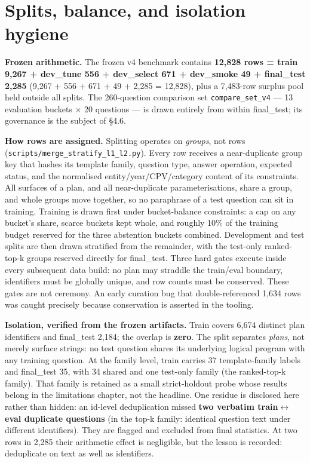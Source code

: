 \section{Splits, balance, and isolation hygiene}\label{sec:splits-balance-and-isolation-hygiene}

\textbf{Frozen arithmetic.} The frozen v4 benchmark contains \textbf{12,828 rows = train 9,267 + dev\_tune 556 + dev\_select 671 + dev\_smoke 49 + final\_test 2,285} (9,267 + 556 + 671 + 49 + 2,285 = 12,828), plus a 7,483-row surplus pool held outside all splits. The 260-question comparison set \texttt{compare\_set\_v4} --- 13 evaluation buckets $\times$ 20 questions --- is drawn entirely from within final\_test; its governance is the subject of §4.6.

\textbf{How rows are assigned.} Splitting operates on \emph{groups}, not rows (\texttt{scripts/merge\_stratify\_l1\_l2.py}). Every row receives a near-duplicate group key that hashes its template family, question type, answer operation, expected status, and the normalised entity/year/CPV/category content of its constraints. All surfaces of a plan, and all near-duplicate parameterisations, share a group, and whole groups move together, so no paraphrase of a test question can sit in training. Training is drawn first under bucket-balance constraints: a cap on any bucket's share, scarce buckets kept whole, and roughly 10\% of the training budget reserved for the three abstention buckets combined. Development and test splits are then drawn stratified from the remainder, with the test-only ranked-top-k groups reserved directly for final\_test. Three hard gates execute inside every subsequent data build: no plan may straddle the train/eval boundary, identifiers must be globally unique, and row counts must be conserved. These gates are not ceremony. An early curation bug that double-referenced 1,634 rows was caught precisely because conservation is asserted in the tooling.

\textbf{Isolation, verified from the frozen artifacts.} Train covers 6,674 distinct plan identifiers and final\_test 2,184; the overlap is \textbf{zero}. The split separates \emph{plans}, not merely surface strings: no test question shares its underlying logical program with any training question. At the family level, train carries 37 template-family labels and final\_test 35, with 34 shared and one test-only family (the ranked-top-k family). That family is retained as a small strict-holdout probe whose results belong in the limitations chapter, not the headline. One residue is disclosed here rather than hidden: an id-level deduplication missed \textbf{two verbatim train$\leftrightarrow$eval duplicate questions} (in the top-k family: identical question text under different identifiers). They are flagged and excluded from final statistics. At two rows in 2,285 their arithmetic effect is negligible, but the lesson is recorded: deduplicate on text as well as identifiers.


